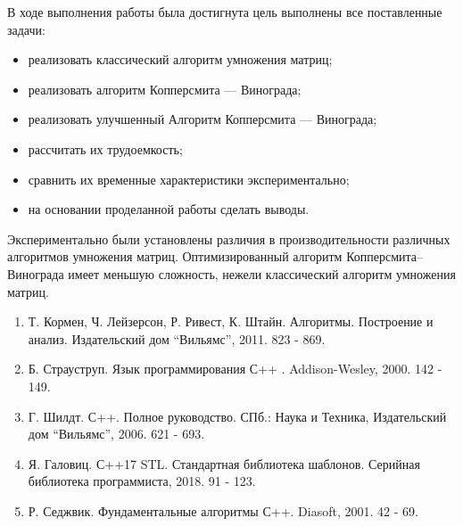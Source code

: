 

В ходе выполнения работы была достигнута цель выполнены все поставленные задачи:

\begin{itemize}
    \item реализовать классический алгоритм умножения матриц;
    \item реализовать алгоритм Копперсмита — Винограда;
    \item реализовать улучшенный Алгоритм Копперсмита — Винограда;
    \item рассчитать их трудоемкость;
    \item сравнить их временные характеристики экспериментально;
    \item на основании проделанной работы сделать выводы.
\end{itemize}

Экспериментально были установлены различия в производительности различных алгоритмов умножения матриц. Оптимизированный алгоритм Копперсмита–Винограда имеет меньшую сложность, нежели классический алгоритм умножения матриц. 

	\begin{enumerate}

		\item Т. Кормен, Ч. Лейзерсон, Р. Ривест, К. Штайн. Алгоритмы. Построение и анализ. Издательский дом ``Вильямс'', 2011. 823 - 869.
		\item Б. Страуструп. Язык программирования С++ . Addison-Wesley, 2000. 142 - 149.
		\item Г. Шилдт. С++. Полное руководство. СПб.: Наука и Техника, Издательский дом “Вильямс”, 2006. 621 - 693.
		\item Я. Галовиц. С++17 STL. Стандартная библиотека шаблонов. Серийная библиотека программиста, 2018. 91 - 123.
		\item Р. Седжвик. Фундаментальные алгоритмы С++. Diasoft, 2001. 42 - 69.

	\end{enumerate}


